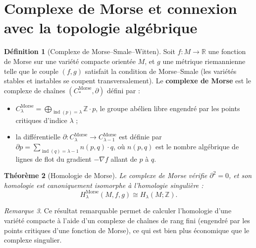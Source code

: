 \documentclass[12pt,a4paper,openany]{book}
\theoremstyle{definition}
\newtheorem{definition}{Définition}[chapter]
\theoremstyle{plain}
\newtheorem{theoreme}[definition]{Théorème}
\theoremstyle{remark}
\newtheorem{remarque}[definition]{Remarque}
\newcommand{\Z}{\mathbb{Z}}
\newcommand{\R}{\mathbb{R}}
\begin{document}
\section{Complexe de Morse et connexion avec la topologie algébrique}%
\label{sec:complexe-morse}

\begin{definition}[Complexe de Morse--Smale--Witten]\label{def:complexe-morse}
Soit $f : M \to \R$ une fonction de Morse sur une variété compacte orientée $M$,
et $g$ une métrique riemannienne telle que le couple $(f, g)$ satisfait la
condition de Morse--Smale (les variétés stables et instables se coupent
transversalement). Le \textbf{complexe de Morse} est le complexe de chaînes
$(C_*^{\mathrm{Morse}}, \partial)$ défini par :
\begin{itemize}
  \item $C_\lambda^{\mathrm{Morse}} = \bigoplus_{\operatorname{ind}(p) = \lambda} \Z \cdot p$,
    le groupe abélien libre engendré par les points critiques d'indice $\lambda$ ;
  \item la différentielle $\partial : C_\lambda^{\mathrm{Morse}} \to C_{\lambda-1}^{\mathrm{Morse}}$
    est définie par $\partial p = \sum_{\operatorname{ind}(q) = \lambda - 1} n(p, q) \cdot q$,
    où $n(p, q)$ est le nombre algébrique de lignes de flot du gradient
    $-\nabla f$ allant de $p$ à $q$.
\end{itemize}
\end{definition}

\begin{theoreme}[Homologie de Morse]\label{thm:homologie-morse}
Le complexe de Morse vérifie $\partial^2 = 0$, et son homologie est
canoniquement isomorphe à l'homologie singulière :
\[
  H_\lambda^{\mathrm{Morse}}(M, f, g) \cong H_\lambda(M; \Z).
\]
\end{theoreme}

\begin{remarque}
Ce résultat remarquable permet de calculer l'homologie d'une variété compacte à
l'aide d'un complexe de chaînes de rang fini (engendré par les points critiques
d'une fonction de Morse), ce qui est bien plus économique que le complexe
singulier.
\end{remarque}

\end{document}
